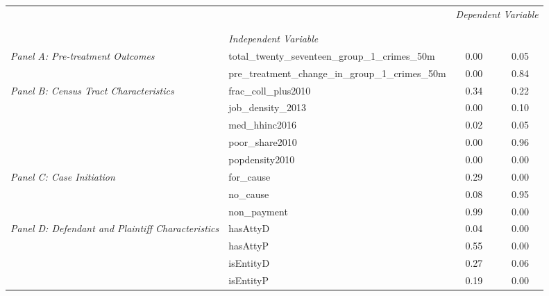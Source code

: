 \begin{tabular}{llcc}
\toprule
 &  & \multicolumn{2}{c}{\textit{Dependent Variable}} \\
\cline{3-4}
\\
 &  &  &  \\
 & \emph{Independent Variable} &  &  \\
\midrule
\multirow[c]{2}{3cm}{\textit{Panel A: Pre-treatment Outcomes}} & total_twenty_seventeen_group_1_crimes_50m & 0.00 & 0.05 \\
 & pre_treatment_change_in_group_1_crimes_50m & 0.00 & 0.84 \\
\cline{1-4}
\multirow[c]{5}{3cm}{\textit{Panel B: Census Tract Characteristics}} & frac_coll_plus2010 & 0.34 & 0.22 \\
 & job_density_2013 & 0.00 & 0.10 \\
 & med_hhinc2016 & 0.02 & 0.05 \\
 & poor_share2010 & 0.00 & 0.96 \\
 & popdensity2010 & 0.00 & 0.00 \\
\cline{1-4}
\multirow[c]{3}{3cm}{\textit{Panel C: Case Initiation}} & for_cause & 0.29 & 0.00 \\
 & no_cause & 0.08 & 0.95 \\
 & non_payment & 0.99 & 0.00 \\
\cline{1-4}
\multirow[c]{4}{3cm}{\textit{Panel D: Defendant and Plaintiff Characteristics}} & hasAttyD & 0.04 & 0.00 \\
 & hasAttyP & 0.55 & 0.00 \\
 & isEntityD & 0.27 & 0.06 \\
 & isEntityP & 0.19 & 0.00 \\
\cline{1-4}
\bottomrule
\end{tabular}
